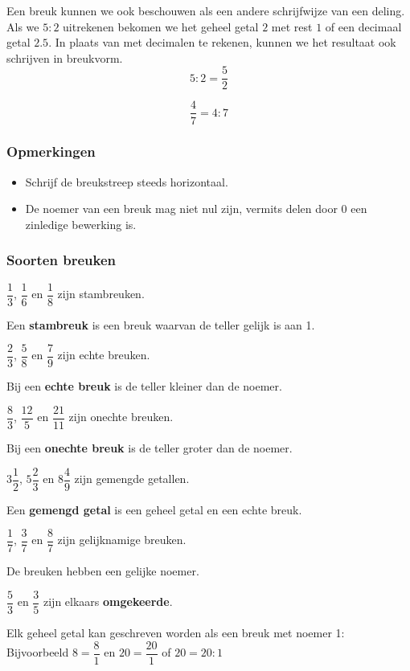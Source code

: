 \documentclass{bis}
\begin{document}
Een breuk kunnen we ook beschouwen als een andere schrijfwijze van een deling.
Als we $5 : 2$ uitrekenen bekomen we het geheel getal $2$ met rest $1$ of een decimaal getal $2.5$. In plaats van met decimalen te rekenen, kunnen we het resultaat ook schrijven in breukvorm.
\[5 : 2 = \dfrac{5}{2}\]

\begin{voorbeeld}
\[\dfrac{4}{7}=4:7\]
\end{voorbeeld}

\subsubsection*{Opmerkingen}
\begin{itemize}
  \item Schrijf de breukstreep steeds horizontaal.
  \item De noemer van een breuk mag niet nul zijn, vermits delen door 0 een zinledige bewerking is.
\end{itemize}

\subsubsection{Soorten breuken}

$\dfrac{1}{3}$, $\dfrac{1}{6}$ en $\dfrac{1}{8}$ zijn stambreuken.

Een {\bf stambreuk} is een breuk waarvan de teller gelijk is aan 1.

$\dfrac{2}{3}$, $\dfrac{5}{8}$ en $\dfrac{7}{9}$ zijn echte breuken.

Bij een {\bf echte breuk} is de teller kleiner dan de noemer.

$\dfrac{8}{3}$, $\dfrac{12}{5}$ en $\dfrac{21}{11}$ zijn onechte breuken.

Bij een {\bf onechte breuk} is de teller groter dan de noemer.

$3\dfrac{1}{2}$, $5\dfrac{2}{3}$ en $8\dfrac{4}{9}$ zijn gemengde getallen.

Een {\bf gemengd getal} is een geheel getal en een echte breuk.

$\dfrac{1}{7}$, $\dfrac{3}{7}$ en $\dfrac{8}{7}$ zijn gelijknamige breuken.

De breuken hebben een gelijke noemer.

$\dfrac{5}{3}$ en $\dfrac{3}{5}$ zijn elkaars {\bf omgekeerde}.

Elk geheel getal kan geschreven worden als een breuk met noemer 1:\\
Bijvoorbeeld $8=\dfrac{8}{1}$ en $20=\dfrac{20}{1}$ of $20=20:1$
\end{document}
